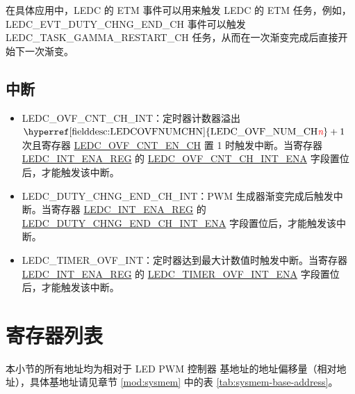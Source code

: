 \documentclass[main\_\_CN.tex]{subfiles}
\begin{document}
在具体应用中，LEDC 的 ETM 事件可以用来触发 LEDC 的 ETM 任务，例如，LEDC\_EVT\_DUTY\_CHNG\_END\_CH 事件可以触发LEDC\_TASK\_GAMMA\_RESTART\_CH 任务，从而在一次渐变完成后直接开始下一次渐变。

\subsection{中断}
\begin{itemize}
\item \label{int:ledc-ovf-cnt}LEDC\_OVF\_CNT\_CH\_INT：定时器计数器溢出 $ \textrm{\hyperref[fielddesc:LEDCOVFNUMCHN]{LEDC\_OVF\_NUM\_CH\regindex{n}}} + 1 $ 次且寄存器 \hyperref[fielddesc:LEDCOVFCNTENCHN]{LEDC\_OVF\_CNT\_EN\_CH} 置 1 时触发中断。当寄存器 \hyperref[regdesc:LEDCINTENAREG]{LEDC\_INT\_ENA\_REG} 的 \hyperref[fielddesc:LEDCOVFCNTCHNINTENA]{LEDC\_OVF\_CNT\_CH\_INT\_ENA} 字段置位后，才能触发该中断。
\item \label{int:ledc-duty-chng-end}LEDC\_DUTY\_CHNG\_END\_CH\_INT：PWM 生成器渐变完成后触发中断。当寄存器 \hyperref[regdesc:LEDCINTENAREG]{LEDC\_INT\_ENA\_REG} 的 \hyperref[fielddesc:LEDCDUTYCHNGENDCHNINTENA]{LEDC\_DUTY\_CHNG\_END\_CH\_INT\_ENA} 字段置位后，才能触发该中断。
\item \label{int:ledc-timer-ovf}LEDC\_TIMER\_OVF\_INT：定时器达到最大计数值时触发中断。当寄存器 \hyperref[regdesc:LEDCINTENAREG]{LEDC\_INT\_ENA\_REG} 的 \hyperref[fielddesc:LEDCTIMERXOVFINTENA]{LEDC\_TIMER\_OVF\_INT\_ENA} 字段置位后，才能触发该中断。
\end{itemize}





\clearpage
\hypertarget{ledpwm-reg-summ}{}
\section{寄存器列表}
\label{sec:ledc-reg-summ}


本小节的所有地址均为相对于 LED PWM 控制器 基地址的地址偏移量（相对地址），具体基地址请见章节 \ref{mod:sysmem} \textit{} 中的表 \ref{tab:sysmem-base-address}。
\end{document}
